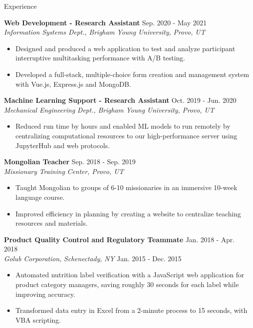 \documentclass{resume} %
\begin{document}
\begin{rSection}{Experience}
\begin{itemize}
    \end{itemize}
    \textbf{Web Development - Research Assistant}\hfill{ Sep.  2020 - May 2021}\\
    \textit{Information Systems Dept., Brigham Young University, Provo, UT} 
    \begin{itemize}
        \item Designed and produced a web application to test and analyze participant interruptive
            multitasking performance with A/B testing.
        \item Developed a full-stack, multiple-choice form creation and management system with
            Vue.js, Express.js and MongoDB.
    \end{itemize}
\textbf{Machine Learning Support - Research Assistant} \hfill{Oct. 2019
- Jun. 2020}\\
\textit{Mechanical Engineering Dept., Brigham Young University, Provo, UT}
    \begin{itemize}
        \item Reduced run time by hours and enabled ML models to run remotely by centralizing
            computational resources to our high-performance server using JupyterHub and web
            protocols.
    \end{itemize}
\textbf{Mongolian Teacher} \hfill {Sep. 2018 - Sep. 2019}\\
\textit{Missionary Training Center, Provo, UT} 
    \begin{itemize}
        \item Taught Mongolian to groups of 6-10 missionaries in an immersive 10-week language
            course.
        \item Improved efficiency in planning by creating a website to centralize teaching
            resources and materials.
    \end{itemize}
\textbf{Product Quality Control and Regulatory Teammate}    \hfill {Jan. 2018 -
Apr. 2018}\\
\textit{Golub Corporation, Schenectady, NY}                 \hfill {Jan. 2015 -
Dec. 2015}  
    \begin{itemize}
        \item Automated nutrition label verification with a JavaScript web application for product
            category managers, saving roughly 30 seconds for each label while improving accuracy.
        \item Transformed data entry in Excel from a 2-minute process to 15 seconds, with
            VBA scripting.
    \end{itemize}
\end{rSection}
\end{document}
